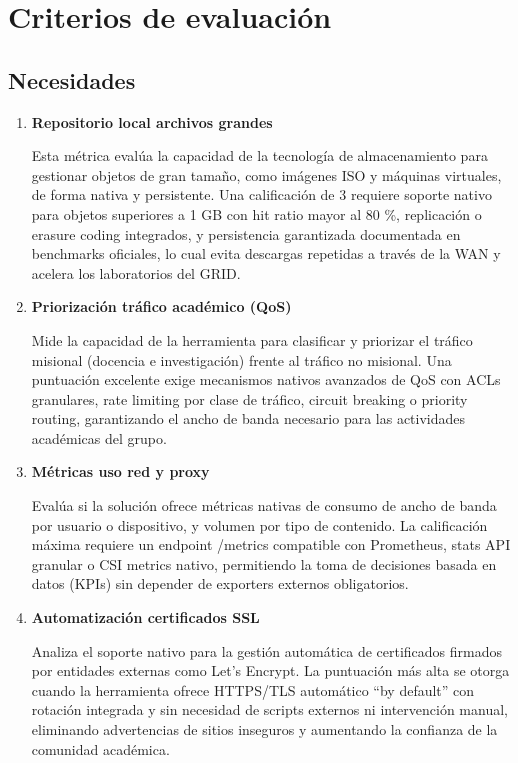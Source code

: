 \section{Criterios de evaluación}\label{sec:criterios}

\subsection{Necesidades}

\begin{enumerate}[label=\textbf{\arabic*.}, leftmargin=*, itemsep=0.7em, series=criterios]
  \item \textbf{Repositorio local archivos grandes}

  Esta métrica evalúa la capacidad de la tecnología de almacenamiento para gestionar objetos de gran tamaño, como imágenes ISO y máquinas virtuales, de forma nativa y persistente. Una calificación de 3 requiere soporte nativo para objetos superiores a 1 GB con hit ratio mayor al 80 \%, replicación o erasure coding integrados, y persistencia garantizada documentada en benchmarks oficiales, lo cual evita descargas repetidas a través de la WAN y acelera los laboratorios del GRID.

  \item \textbf{Priorización tráfico académico (QoS)}

  Mide la capacidad de la herramienta para clasificar y priorizar el tráfico misional (docencia e investigación) frente al tráfico no misional. Una puntuación excelente exige mecanismos nativos avanzados de QoS con ACLs granulares, rate limiting por clase de tráfico, circuit breaking o priority routing, garantizando el ancho de banda necesario para las actividades académicas del grupo.

  \item \textbf{Métricas uso red y proxy}

  Evalúa si la solución ofrece métricas nativas de consumo de ancho de banda por usuario o dispositivo, y volumen por tipo de contenido. La calificación máxima requiere un endpoint /metrics compatible con Prometheus, stats API granular o CSI metrics nativo, permitiendo la toma de decisiones basada en datos (KPIs) sin depender de exporters externos obligatorios.

  \item \textbf{Automatización certificados SSL}

  Analiza el soporte nativo para la gestión automática de certificados firmados por entidades externas como Let's Encrypt. La puntuación más alta se otorga cuando la herramienta ofrece HTTPS/TLS automático ``by default'' con rotación integrada y sin necesidad de scripts externos ni intervención manual, eliminando advertencias de sitios inseguros y aumentando la confianza de la comunidad académica.

\end{enumerate}

